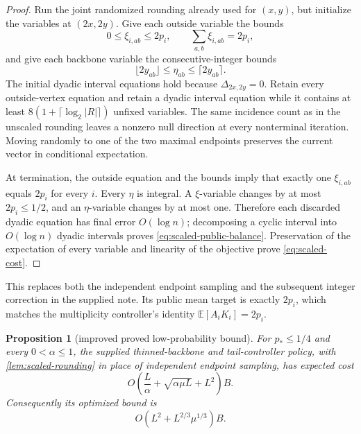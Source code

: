 \documentclass[11pt]{article}
\newtheorem{proposition}[theorem]{Proposition}
\theoremstyle{remark}
\newcommand{\E}{\mathbb E}
\begin{document}
\begin{proof}
Run the joint randomized rounding already used for $(x,y)$, but initialize
the variables at $(2x,2y)$.  Give each outside variable the bounds
\[
  0\le \xi_{i,ab}\le2p_i,
  \qquad
  \sum_{a,b}\xi_{i,ab}=2p_i,
\]
and give each backbone variable the consecutive-integer bounds
\[
  \lfloor2y_{ab}\rfloor
  \le\eta_{ab}\le
  \lceil2y_{ab}\rceil.
\]
The initial dyadic interval equations hold because
$\Delta_{2x,2y}=0$.  Retain every outside-vertex equation and retain a
dyadic interval equation while it contains at least
$8(1+\lceil\log_2|R|\rceil)$ unfixed variables.  The same incidence count
as in the unscaled rounding leaves a nonzero null direction at every
nonterminal iteration.  Moving randomly to one of the two maximal endpoints
preserves the current vector in conditional expectation.

At termination, the outside equation and the bounds imply that exactly one
$\xi_{i,ab}$ equals $2p_i$ for every $i$.  Every $\eta$ is integral.  A
$\xi$-variable changes by at most $2p_i\le1/2$, and an $\eta$-variable
changes by at most one.  Therefore each discarded dyadic equation has final
error $O(\log n)$; decomposing a cyclic interval into $O(\log n)$ dyadic
intervals proves \eqref{eq:scaled-public-balance}.  Preservation of the
expectation of every variable and linearity of the objective prove
\eqref{eq:scaled-cost}.
\end{proof}

This replaces both the independent endpoint sampling and the subsequent
integer correction in the supplied note.  Its public mean target is exactly
$2p_i$, which matches the multiplicity controller's identity
$\E[A_iK_i]=2p_i$.

\begin{proposition}[improved proved low-probability bound]
\label{prop:improved-low}
For $p_*\le1/4$ and every $0<\alpha\le1$, the supplied thinned-backbone and
tail-controller policy, with \cref{lem:scaled-rounding} in place of
independent endpoint sampling, has expected cost
\begin{equation}\label{eq:proved-low}
 O\!\left(
   \frac L\alpha+\sqrt{\alpha\mu L}+L^2
 \right)B.
\end{equation}
Consequently its optimized bound is
\begin{equation}\label{eq:proved-low-optimized}
 O\!\left(L^2+L^{2/3}\mu^{1/3}\right)B.
\end{equation}
\end{proposition}
\end{document}
